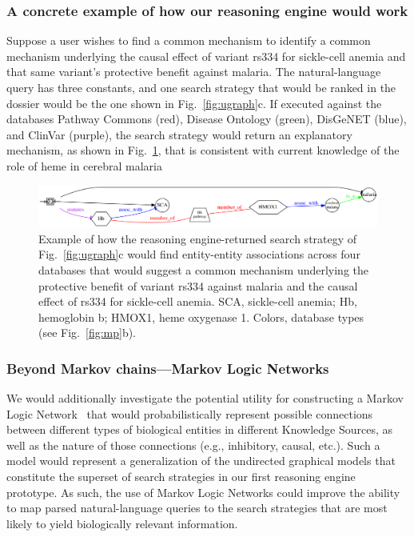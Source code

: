 \documentclass[11pt,notitlepage]{article}
\begin{document}
\subsubsection{A concrete example of how our reasoning engine would work}
Suppose a user wishes to find a common mechanism to identify a common
mechanism underlying the causal effect of variant rs334 for sickle-cell anemia
and that same variant's protective benefit against malaria. The natural-language
query has three constants, and one search strategy that would be ranked in the dossier
would be the one shown in Fig.~\ref{fig:ugraph}c. If executed against the databases
Pathway Commons (red), Disease Ontology (green), DisGeNET (blue), and ClinVar (purple),
the search strategy would return an explanatory mechanism, as shown in Fig.~\ref{fig:malaria},
that is consistent with current knowledge of the role of heme in cerebral malaria~\cite{Ferreira:2011ff}
\begin{figure}[h!]
     \includegraphics[width=6in]{net5.png} 
     \caption{Example of how the reasoning engine-returned search strategy of
       Fig.~\ref{fig:ugraph}c would find entity-entity associations across four
       databases that would suggest a common mechanism underlying the
       protective benefit of variant rs334 against malaria and the causal effect
       of rs334 for sickle-cell anemia. SCA, sickle-cell anemia; Hb,
       hemoglobin b; HMOX1, heme oxygenase 1.  Colors, database
       types (see Fig.~\ref{fig:mp}b).}
  \label{fig:malaria}
\end{figure}

\subsubsection{Beyond Markov chains---Markov Logic Networks}
We would additionally investigate the potential utility for constructing a
Markov Logic Network~\cite{Domingos:2012wi,domingos20071} that would
probabilistically represent possible connections between different types of
biological entities in different Knowledge Sources, as well as the nature of
those connections (e.g., inhibitory, causal, etc.). Such a model would represent
a generalization of the undirected graphical models that constitute the superset
of search strategies in our first reasoning engine prototype. As such, the use
of Markov Logic Networks could improve the ability to map parsed
natural-language queries to the search strategies that are most likely to yield
biologically relevant information.
\end{document}
